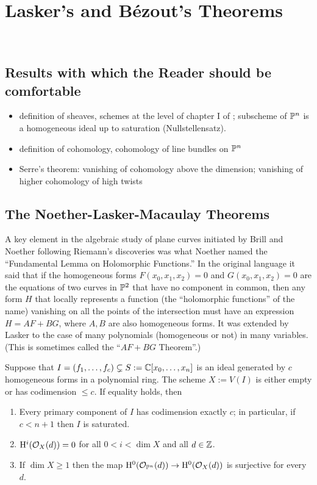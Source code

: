 

\chapter{Lasker's and B\'ezout's Theorems}

\


\section{Results with which the Reader should be comfortable}

\begin{itemize}
\item definition of sheaves, schemes at the level of chapter I of \cite{GeomSchemes}; subscheme of $\PP^{n}$ is a homogeneous ideal up to saturation (Nullstellensatz).
\item definition of cohomology, cohomology of line bundles on $\PP^{n}$
\item Serre's theorem: vanishing of cohomology above the dimension; vanishing of higher cohomology of high twists
\end{itemize}

\section{The Noether-Lasker-Macaulay Theorems}

A key element in the algebraic study of plane curves initiated by Brill and Noether following Riemann's discoveries was what Noether named the ``Fundamental Lemma on Holomorphic Functions.'' In the original language it said that if the homogeneous forms $F(x_{0},x_{1},x_{2})=0$ and $G(x_{0},x_{1},x_{2})=0$ are the equations of two curves in $\PP^{2}$ that have no component in common, then any form $H$ that locally represents a function (the ``holomorphic functions'' of the name) vanishing on all the points
of the intersection must have an expression $H = AF+BG$, where $A,B$ are also homogeneous forms. It was extended by Lasker to the case of many polynomials (homogeneous or not) in many variables. (This is sometimes called the ``$AF+BG$ Theorem''.) 

\begin{theorem}\label{Lasker}
Suppose that $I = (f_{1}, \dots, f_{c}) \subsetneq S:=\CC[x_{0},\dots,x_{n}]$ is an ideal generated by $c$ homogeneous forms in a polynomial ring. 
The scheme $X:= V(I)$ is either empty or has codimension $\leq c$. If equality holds, then
\begin{enumerate}
 \item Every primary component of $I$ has codimension exactly $c$; in particular, if $c<n+1$ then $I$ is saturated.
 \item $\HH^{i}(\cO_{X}(d)) = 0$ for all $0<i<\dim X$ and all $d\in \ZZ$.
 \item If $\dim X\geq 1$
then the map
$\HH^{0}(\cO_{\PP^{n}}(d)) \to \HH^{0}(\cO_{X}(d))$ is surjective for every $d$.
\end{enumerate}
\end{theorem}

